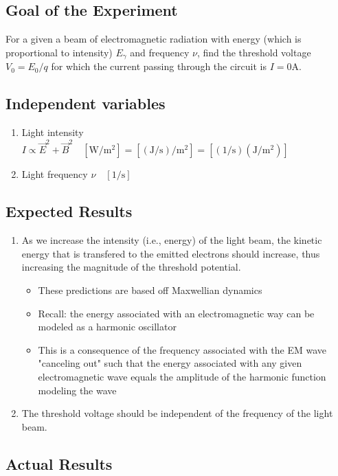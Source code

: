 \documentclass[a4paper]{article}
\begin{document}
\subsection*{Goal of the Experiment}
For a given a beam of electromagnetic radiation with energy (which is proportional to intensity) $E_\gamma$ and frequency $\nu$, find the threshold voltage $V_0=E_0/q$ for which the current passing through the circuit is $I=0 \mathrm{A}$.
\subsection*{Independent variables}
\begin{enumerate}
    \item Light intensity $I \propto \vec{E}^2 + \vec{B}^2 \quad [\mathrm{W/m^2}] = [\mathrm{(J/s)/m^2}]=[\mathrm{(1/s)(J/m^2)}]$
    \item Light frequency $\nu \quad [\mathrm{1/s}]$
\end{enumerate}
\subsection*{Expected Results} 
\begin{enumerate}
    \item As we increase the intensity (i.e., energy) of the light beam, the kinetic energy that is  transfered to the emitted electrons should increase, thus increasing the magnitude of the threshold potential. 
    \begin{itemize}
        \item These predictions are based off Maxwellian dynamics 
        \item Recall: the energy associated with an electromagnetic way can be modeled as a harmonic oscillator 
        \item This is a consequence of the frequency associated with the EM wave "canceling out" such that the energy associated with any given electromagnetic wave equals the amplitude of the harmonic function modeling the wave
    \end{itemize}
    \item The threshold voltage should be independent of the frequency of the light beam. 
\end{enumerate}

\subsection*{Actual Results}
\end{document}
